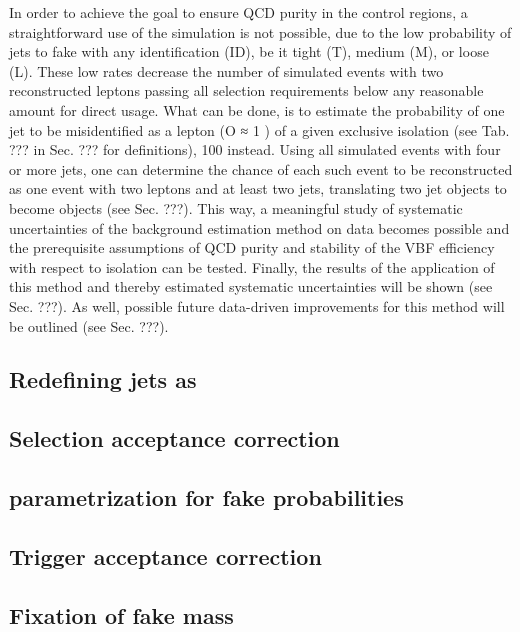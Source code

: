 In order to achieve the goal to ensure QCD purity in the control regions, a straightforward use of the simulation is not possible, due to the low probability of jets to fake \hadtau with any identification (ID), be it tight (T), medium (M), or loose (L). These low rates decrease the number of simulated events with two reconstructed \hadtau leptons passing all selection requirements below any reasonable amount for direct usage. What can be done, is to estimate the probability of one jet to be misidentified as a \hadtau lepton (O ≈ 1 ) of a given exclusive isolation (see Tab. ??? in Sec. ??? for definitions), 100 instead. Using all simulated events with four or more jets, one can determine the chance of each such event to be reconstructed as one event with two \hadtau leptons and at least two jets, translating two jet objects to become \hadtau objects (see Sec. ???). This way, a meaningful study of systematic uncertainties of the background estimation method on data becomes possible and the prerequisite assumptions of QCD purity and stability of the VBF efficiency with respect to \hadtaufake isolation can be tested. Finally, the results of the application of this method and thereby estimated systematic uncertainties will be shown (see Sec. ???). As well, possible future data-driven improvements for this method will be outlined (see Sec. ???).

\subsection*{Redefining jets as \hadtau}

\subsection*{Selection acceptance correction}

\subsection*{parametrization for fake probabilities}

\subsection*{Trigger acceptance correction}

\subsection*{Fixation of fake \hadtau mass}

